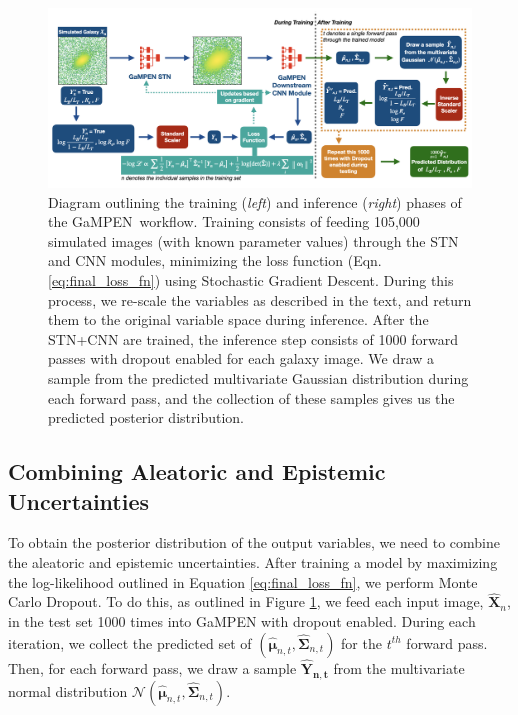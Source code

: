 \documentclass[twocolumn]{aastex63}
\newcommand\gampen{GaMPEN}
\begin{document}
\begin{CJK*}{UTF8}{gbsn}
\begin{figure}[htb]
    \centering
    \includegraphics[width
    =\textwidth]{workflow_gampen.png}
    \caption{Diagram outlining the training (\textit{left}) and inference (\textit{right}) phases of the \gampen\ workflow. Training consists of feeding 105,000 simulated images (with known parameter values) through the STN and CNN modules, minimizing the loss function (Eqn.\,\ref{eq:final_loss_fn}) using Stochastic Gradient Descent. 
    During this process, we re-scale the variables as described in the text, and return them to the original variable space during inference.
    After the STN+CNN are trained, the inference step consists of 1000 forward passes with dropout enabled for each galaxy image. We draw a sample from the predicted multivariate Gaussian distribution during each forward pass, and the collection of these samples gives us the predicted posterior distribution.}
    \label{fig:workflow}
\end{figure}

\subsection{Combining Aleatoric and Epistemic Uncertainties}
\label{subsec:combining_uncertainties}
To obtain the posterior distribution of the output variables, we need to combine the aleatoric and epistemic uncertainties. After training a model by maximizing the log-likelihood outlined in Equation \ref{eq:final_loss_fn}, we perform Monte Carlo Dropout. To do this, as outlined in Figure \ref{fig:workflow}, we feed each input image, $\boldsymbol{\hat{X}}_n$, in the test set 1000 times into \gampen{} with dropout enabled. During each iteration, we collect the predicted set of $\left(\hat{\boldsymbol{\mu}}_{n,t},\boldsymbol{\hat{\Sigma}}_{n,t}\right)$ for the $t^{th}$ forward pass. Then, for each forward pass, we draw a sample $\boldsymbol{\hat{Y}_{n,t}}$ from the multivariate normal distribution $\mathcal{N}\left(\boldsymbol{\hat{\mu}}_{n,t},\boldsymbol{\hat{\Sigma}}_{n,t}\right)$. 


\end{CJK*}
\end{document}
